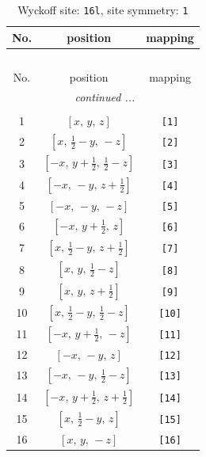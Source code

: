 \documentclass[fleqn,8pt]{jsarticle}
\begin{document}
\begin{longtable}{ccc}
\caption{Wyckoff site: {\tt 16l}, site symmetry: {\tt 1}}
 \\
 \hline \hline
No. & position & mapping \\ \hline \endfirsthead

\multicolumn{2}{l}{\tablename\ \thetable{}} \\
 \hline \hline
No. & position & mapping \\ \hline \endhead

 \hline \hline
\multicolumn{2}{r}{\footnotesize\it continued ...} \\ \endfoot

 \hline \hline
\multicolumn{2}{r}{} \\ \endlastfoot

1 & $\left[ x,\, y,\, z \right]$ & {\tt [1]} \\ \hline
2 & $\left[ x,\, \frac{1}{2} - y,\, - z \right]$ & {\tt [2]} \\ \hline
3 & $\left[ - x,\, y + \frac{1}{2},\, \frac{1}{2} - z \right]$ & {\tt [3]} \\ \hline
4 & $\left[ - x,\, - y,\, z + \frac{1}{2} \right]$ & {\tt [4]} \\ \hline
5 & $\left[ - x,\, - y,\, - z \right]$ & {\tt [5]} \\ \hline
6 & $\left[ - x,\, y + \frac{1}{2},\, z \right]$ & {\tt [6]} \\ \hline
7 & $\left[ x,\, \frac{1}{2} - y,\, z + \frac{1}{2} \right]$ & {\tt [7]} \\ \hline
8 & $\left[ x,\, y,\, \frac{1}{2} - z \right]$ & {\tt [8]} \\ \hline
9 & $\left[ x,\, y,\, z + \frac{1}{2} \right]$ & {\tt [9]} \\ \hline
10 & $\left[ x,\, \frac{1}{2} - y,\, \frac{1}{2} - z \right]$ & {\tt [10]} \\ \hline
11 & $\left[ - x,\, y + \frac{1}{2},\, - z \right]$ & {\tt [11]} \\ \hline
12 & $\left[ - x,\, - y,\, z \right]$ & {\tt [12]} \\ \hline
13 & $\left[ - x,\, - y,\, \frac{1}{2} - z \right]$ & {\tt [13]} \\ \hline
14 & $\left[ - x,\, y + \frac{1}{2},\, z + \frac{1}{2} \right]$ & {\tt [14]} \\ \hline
15 & $\left[ x,\, \frac{1}{2} - y,\, z \right]$ & {\tt [15]} \\ \hline
16 & $\left[ x,\, y,\, - z \right]$ & {\tt [16]} \\
\end{longtable}
\end{document}
